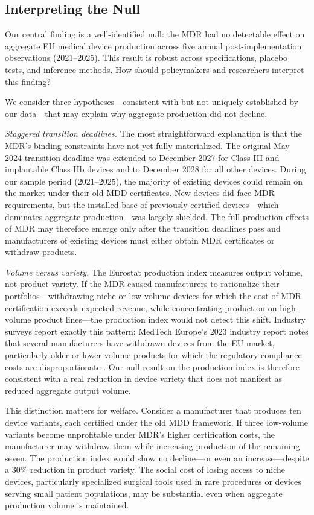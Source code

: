 \documentclass[12pt]{article}
\begin{document}
\subsection{Interpreting the Null}

Our central finding is a well-identified null: the MDR had no detectable effect on aggregate EU medical device production across five annual post-implementation observations (2021--2025). This result is robust across specifications, placebo tests, and inference methods. How should policymakers and researchers interpret this finding?

We consider three hypotheses---consistent with but not uniquely established by our data---that may explain why aggregate production did not decline.

\textit{Staggered transition deadlines.} The most straightforward explanation is that the MDR's binding constraints have not yet fully materialized. The original May 2024 transition deadline was extended to December 2027 for Class III and implantable Class IIb devices and to December 2028 for all other devices. During our sample period (2021--2025), the majority of existing devices could remain on the market under their old MDD certificates. New devices did face MDR requirements, but the installed base of previously certified devices---which dominates aggregate production---was largely shielded. The full production effects of MDR may therefore emerge only after the transition deadlines pass and manufacturers of existing devices must either obtain MDR certificates or withdraw products.

\textit{Volume versus variety.} The Eurostat production index measures output volume, not product variety. If the MDR caused manufacturers to rationalize their portfolios---withdrawing niche or low-volume devices for which the cost of MDR certification exceeds expected revenue, while concentrating production on high-volume product lines---the production index would not detect this shift. Industry surveys report exactly this pattern: MedTech Europe's 2023 industry report notes that several manufacturers have withdrawn devices from the EU market, particularly older or lower-volume products for which the regulatory compliance costs are disproportionate \citep{medtecheurope2023industry}. Our null result on the production index is therefore consistent with a real reduction in device variety that does not manifest as reduced aggregate output volume.

This distinction matters for welfare. Consider a manufacturer that produces ten device variants, each certified under the old MDD framework. If three low-volume variants become unprofitable under MDR's higher certification costs, the manufacturer may withdraw them while increasing production of the remaining seven. The production index would show no decline---or even an increase---despite a 30\% reduction in product variety. The social cost of losing access to niche devices, particularly specialized surgical tools used in rare procedures or devices serving small patient populations, may be substantial even when aggregate production volume is maintained.
\end{document}
